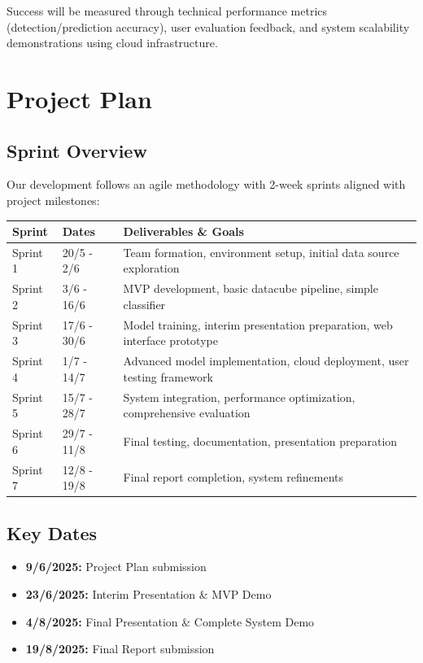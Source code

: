 \documentclass[12pt]{article}
\begin{document}
Success will be measured through technical performance metrics (detection/prediction accuracy), user evaluation feedback, and system scalability demonstrations using cloud infrastructure.

\section{Project Plan}

\subsection{Sprint Overview}
Our development follows an agile methodology with 2-week sprints aligned with project milestones:

\begin{longtable}{|p{2cm}|p{3cm}|p{8cm}|}
\hline
\textbf{Sprint} & \textbf{Dates} & \textbf{Deliverables \& Goals} \\
\hline
Sprint 1 & 20/5 - 2/6 & Team formation, environment setup, initial data source exploration \\
\hline
Sprint 2 & 3/6 - 16/6 & MVP development, basic datacube pipeline, simple classifier \\
\hline
Sprint 3 & 17/6 - 30/6 & Model training, interim presentation preparation, web interface prototype \\
\hline
Sprint 4 & 1/7 - 14/7 & Advanced model implementation, cloud deployment, user testing framework \\
\hline
Sprint 5 & 15/7 - 28/7 & System integration, performance optimization, comprehensive evaluation \\
\hline
Sprint 6 & 29/7 - 11/8 & Final testing, documentation, presentation preparation \\
\hline
Sprint 7 & 12/8 - 19/8 & Final report completion, system refinements \\
\hline
\end{longtable}

\subsection{Key Dates}
\begin{itemize}
    \item \textbf{9/6/2025:} Project Plan submission
    \item \textbf{23/6/2025:} Interim Presentation \& MVP Demo
    \item \textbf{4/8/2025:} Final Presentation \& Complete System Demo
    \item \textbf{19/8/2025:} Final Report submission
\end{itemize}
\end{document}
